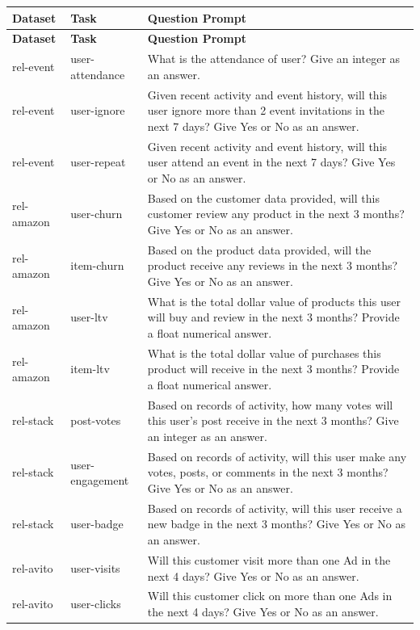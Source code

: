 \documentclass[11pt]{article}
\begin{document}
\begin{longtable}{@{}p{2cm}p{2cm}p{11cm}@{}}
    \toprule
    \textbf{Dataset} & \textbf{Task} & \textbf{Question Prompt} \\
    \midrule
    \endfirsthead
    \toprule
    \textbf{Dataset} & \textbf{Task} & \textbf{Question Prompt} \\
    \midrule
    \endhead
    \bottomrule
    \endfoot
    rel-event & user-attendance & What is the attendance of user? Give an integer as an answer. \\
    rel-event & user-ignore & Given recent activity and event history, will this user ignore more than 2 event invitations in the next 7 days? Give Yes or No as an answer. \\
    rel-event & user-repeat & Given recent activity and event history, will this user attend an event in the next 7 days? Give Yes or No as an answer. \\
    rel-amazon & user-churn & Based on the customer data provided, will this customer review any product in the next 3 months? Give Yes or No as an answer. \\
    rel-amazon & item-churn & Based on the product data provided, will the product receive any reviews in the next 3 months? Give Yes or No as an answer. \\
    rel-amazon & user-ltv & What is the total dollar value of products this user will buy and review in the next 3 months? Provide a float numerical answer. \\
    rel-amazon & item-ltv & What is the total dollar value of purchases this product will receive in the next 3 months? Provide a float numerical answer. \\
    rel-stack & post-votes & Based on records of activity, how many votes will this user's post receive in the next 3 months? Give an integer as an answer. \\
    rel-stack & user-engagement & Based on records of activity, will this user make any votes, posts, or comments in the next 3 months? Give Yes or No as an answer. \\
    rel-stack & user-badge & Based on records of activity, will this user receive a new badge in the next 3 months? Give Yes or No as an answer. \\
    rel-avito & user-visits & Will this customer visit more than one Ad in the next 4 days? Give Yes or No as an answer. \\
    rel-avito & user-clicks & Will this customer click on more than one Ads in the next 4 days? Give Yes or No as an answer. \\

\end{longtable}
\end{document}
